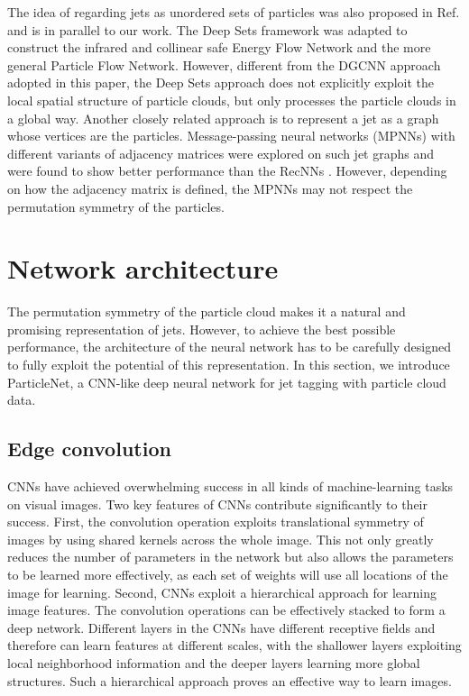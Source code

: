 \documentclass[aps,prd,longbibliography,reprint,amsmath,amssymb,amsfonts]{revtex4-1}
\begin{document}
The idea of regarding jets as unordered sets of particles was also proposed in Ref. \cite{Komiske:2018cqr} and is in parallel to our work. The Deep Sets framework \cite{zaheer2017deep} was adapted to construct the infrared and collinear safe Energy Flow Network and the more general Particle Flow Network. However, different from the DGCNN \cite{DBLP:journals/corr/abs-1801-07829} approach adopted in this paper, the Deep Sets approach does not explicitly exploit the local spatial structure of particle clouds, but only processes the particle clouds in a global way.
Another closely related approach is to represent a jet as a graph whose vertices are the particles. Message-passing neural networks (MPNNs) with different variants of adjacency matrices were explored on such jet graphs and were found to show better performance than the RecNNs \cite{henrionneural}. However, depending on how the adjacency matrix is defined, the MPNNs may not respect the permutation symmetry of the particles.

 \section{Network architecture}
\label{sec:model}

The permutation symmetry of the particle cloud makes it a natural and promising representation of jets. However, to achieve the best possible performance, the architecture of the neural network has to be carefully designed to fully exploit the potential of this representation. In this section, we introduce ParticleNet, a CNN-like deep neural network for jet tagging with particle cloud data. 

\subsection{Edge convolution}

\newcommand\BigBox{\vcenter{\hbox{\scalebox{2}{}}}}
\newcommand\bigsquare{\mathop{\BigBox}\limits}
\newcommand\MedBox{\vcenter{\hbox{\scalebox{1.2}{}}}}

CNNs have achieved overwhelming success in all kinds of machine-learning tasks on visual images. Two key features of CNNs contribute significantly to their success. First, the convolution operation exploits translational symmetry of images by using shared kernels across the whole image. This not only greatly reduces the number of parameters in the network but also allows the parameters to be learned more effectively, as each set of weights will use all locations of the image for learning. Second, CNNs exploit a hierarchical approach \cite{zeiler2014visualizing} for learning image features. The convolution operations can be effectively stacked to form a deep network. Different layers in the CNNs have different receptive fields and therefore can learn features at different scales, with the shallower layers exploiting local neighborhood information and the deeper layers learning more global structures. Such a hierarchical approach proves an effective way to learn images.
\end{document}
